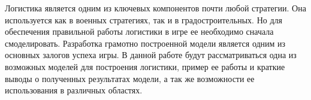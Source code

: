 
Логистика является одним из ключевых компонентов почти любой стратегии. Она используется как в военных стратегиях, так и в градостроительных. Но для обеспечения правильной работы логистики в игре ее необходимо сначала смоделировать. Разработка грамотно построенной модели является одним из основных залогов успеха игры. В данной работе будут рассматриваться одна из возможных моделей для построения логистики, пример ее работы и краткие выводы о полученных результатах модели, а так же возможности ее использования в различных областях.

\clearpage